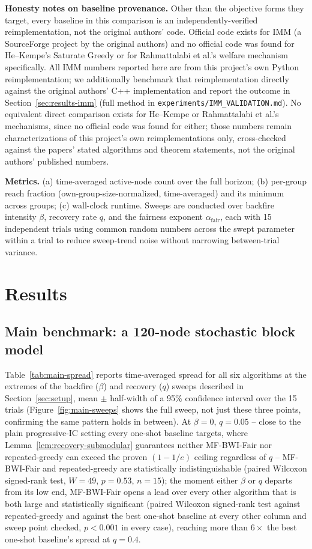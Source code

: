 \documentclass[journal]{IEEEtran}
\begin{document}
\textbf{Honesty notes on baseline provenance.} Other than the objective
forms they target, every baseline in this comparison is an
independently-verified reimplementation, not the original authors' code.
Official code exists for IMM (a SourceForge project by the original
authors) and no official code was found for He--Kempe's Saturate Greedy or
for Rahmattalabi et al.'s welfare mechanism specifically. All IMM numbers
reported here are from this project's own Python reimplementation; we
additionally benchmark that reimplementation directly against the original
authors' C++ implementation and report the outcome in
Section~\ref{sec:results-imm} (full method in
\texttt{experiments/IMM\_VALIDATION.md}). No equivalent direct comparison
exists for He--Kempe or Rahmattalabi et al.'s mechanisms, since no official
code was found for either; those numbers remain characterizations of this
project's own reimplementations only, cross-checked against the papers'
stated algorithms and theorem statements, not the original authors'
published numbers.

\textbf{Metrics.} (a) time-averaged active-node count over the full
horizon; (b) per-group reach fraction (own-group-size-normalized,
time-averaged) and its minimum across groups; (c) wall-clock runtime.
Sweeps are conducted over backfire intensity $\beta$, recovery rate $q$,
and the fairness exponent $\alpha_{\mathrm{fair}}$, each with 15
independent trials using common random numbers across the swept parameter
within a trial to reduce sweep-trend noise without narrowing between-trial
variance.

\section{Results}
\label{sec:results}

\subsection{Main benchmark: a 120-node stochastic block model}
\label{sec:results-main}

Table~\ref{tab:main-spread} reports time-averaged spread for all six
algorithms at the extremes of the backfire ($\beta$) and recovery ($q$)
sweeps described in Section~\ref{sec:setup}, mean $\pm$ half-width of a
95\% confidence interval over the 15 trials
(Figure~\ref{fig:main-sweeps} shows the full sweep, not just these three
points, confirming the same pattern holds in between). At $\beta=0$,
$q=0.05$ -- close to the plain progressive-IC setting every one-shot
baseline targets, where Lemma~\ref{lem:recovery-submodular} guarantees
neither MF-BWI-Fair nor repeated-greedy can exceed the proven $(1-1/e)$
ceiling regardless of $q$ -- MF-BWI-Fair and repeated-greedy are
statistically indistinguishable (paired Wilcoxon signed-rank test,
$W=49$, $p=0.53$, $n=15$); the moment either $\beta$ or $q$ departs from
its low end, MF-BWI-Fair opens a lead over every other algorithm that is
both large and statistically significant (paired Wilcoxon signed-rank
test against repeated-greedy and against the best one-shot baseline at
every other column and sweep point checked, $p<0.001$ in every case),
reaching more than $6\times$ the best one-shot baseline's spread at
$q=0.4$.
\end{document}

